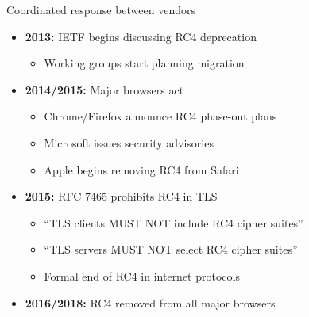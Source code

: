 \documentclass[aspectratio=169, lualatex, handout]{beamer}
\begin{document}
\begin{frame}{Coordinated response between vendors}
	\begin{itemize}[<+->]
		\item \textbf{2013:} IETF begins discussing RC4 deprecation
		      \begin{itemize}[<+->]
			      \item Working groups start planning migration
		      \end{itemize}
		\item \textbf{2014/2015:} Major browsers act
		      \begin{itemize}[<+->]
			      \item Chrome/Firefox announce RC4 phase-out plans
			      \item Microsoft issues security advisories
			      \item Apple begins removing RC4 from Safari
		      \end{itemize}
		\item \textbf{2015:} RFC 7465 prohibits RC4 in TLS
		      \begin{itemize}[<+->]
			      \item ``TLS clients MUST NOT include RC4 cipher suites''
			      \item ``TLS servers MUST NOT select RC4 cipher suites''
			      \item Formal end of RC4 in internet protocols
		      \end{itemize}
		\item \textbf{2016/2018:} RC4 removed from all major browsers
	\end{itemize}
\end{frame}
\end{document}
